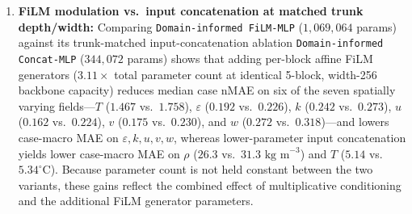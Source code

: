 \documentclass[11pt]{article}
\begin{document}
\begin{enumerate}
  \item \textbf{FiLM modulation vs.\ input concatenation at matched trunk depth/width:} Comparing \texttt{Domain-informed FiLM-MLP} ($1,069,064$ params) against its trunk-matched input-concatenation ablation \texttt{Domain-informed Concat-MLP} ($344,072$ params) shows that adding per-block affine FiLM generators ($3.11\times$ total parameter count at identical 5-block, width-256 backbone capacity) reduces median case nMAE on six of the seven spatially varying fields---$T$ ($1.467$ vs.\ $1.758$), $\varepsilon$ ($0.192$ vs.\ $0.226$), $k$ ($0.242$ vs.\ $0.273$), $u$ ($0.162$ vs.\ $0.224$), $v$ ($0.175$ vs.\ $0.230$), and $w$ ($0.272$ vs.\ $0.318$)---and lowers case-macro MAE on $\varepsilon, k, u, v, w$, whereas lower-parameter input concatenation yields lower case-macro MAE on $\rho$ ($26.3$ vs.\ $31.3\text{ kg m}^{-3}$) and $T$ ($5.14$ vs.\ $5.34^\circ\text{C}$). Because parameter count is not held constant between the two variants, these gains reflect the combined effect of multiplicative conditioning and the additional FiLM generator parameters.

\end{enumerate}
\end{document}
